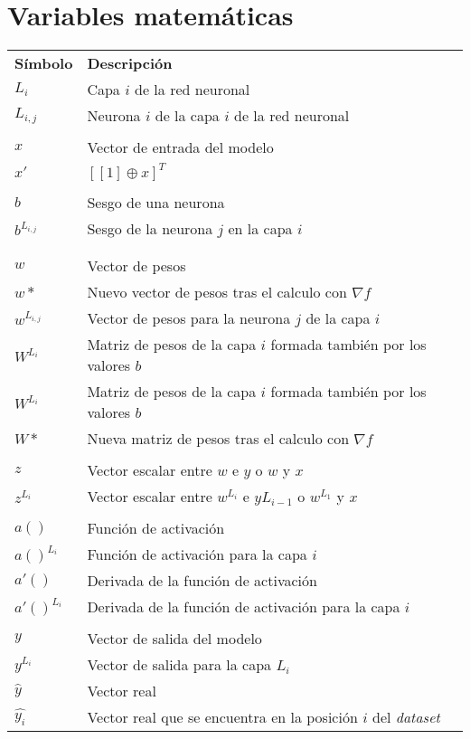 \section{Variables matemáticas}
\begin{tabular}{@{}ll@{}} 
\textbf{Símbolo} & \textbf{Descripción} \\
$L_i$ & Capa $i$ de la red neuronal\\
$L_{i,j}$ & Neurona $i$ de la capa $i$ de la red neuronal\\
\\
$x$ & Vector de entrada del modelo \\
$x'$ & $[[1] \oplus x]^T$ \\
\\
$b$ & Sesgo de una neurona \\
$b^{L_{i, j}}$ & Sesgo de la neurona $j$ en la capa $i$ \\
\\\\
$w$ & Vector de pesos \\
$w*$ & Nuevo vector de pesos tras el calculo con $\nabla f$\\
$w^{L_{i, j}}$ & Vector de pesos para la neurona $j$ de la capa $i$ \\
$W^{L_{i}}$ & Matriz de pesos de la capa $i$ formada también por los valores $b$ \\
$W^{L_{i}}$ & Matriz de pesos de la capa $i$ formada también por los valores $b$ \\
$W*$ & Nueva matriz de pesos tras el calculo con $\nabla f$\\
\\
$z$ & Vector escalar entre $w$ e $y$ o $w$ y $x$\\
$z^{L_i}$ & Vector escalar entre $w^{L_i}$ e $y{L_{i-1}}$ o $w^{L_1}$ y $x$\\
\\
$a()$ & Función de activación\\
$a()^{L_i}$ & Función de activación para la capa $i$\\
$a'()$ & Derivada de la función de activación\\
$a'()^{L_i}$ & Derivada de la función de activación para la capa $i$\\
\\
$y$ & Vector de salida del modelo \\
$y^{L_i}$ & Vector de salida para la capa $L_i$ \\
$\hat{y}$ & Vector real \\
$\hat{y_i}$ & Vector real que se encuentra en la posición $i$ del \textit{dataset} \\

\end{tabular}

